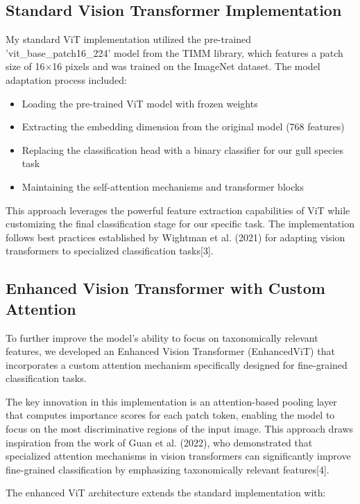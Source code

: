 \subsection{Standard Vision Transformer Implementation}

My standard ViT implementation utilized the pre-trained 'vit\_base\_patch16\_224' model from the TIMM library, which features a patch size of 16$\times$16 pixels and was trained on the ImageNet dataset. The model adaptation process included:

\begin{itemize}
    \item Loading the pre-trained ViT model with frozen weights
    \item Extracting the embedding dimension from the original model (768 features)
    \item Replacing the classification head with a binary classifier for our gull species task
    \item Maintaining the self-attention mechanisms and transformer blocks
\end{itemize}

This approach leverages the powerful feature extraction capabilities of ViT while customizing the final classification stage for our specific task. The implementation follows best practices established by Wightman et al. (2021) for adapting vision transformers to specialized classification tasks[3].

\subsection{Enhanced Vision Transformer with Custom Attention}

To further improve the model's ability to focus on taxonomically relevant features, we developed an Enhanced Vision Transformer (EnhancedViT) that incorporates a custom attention mechanism specifically designed for fine-grained classification tasks.

The key innovation in this implementation is an attention-based pooling layer that computes importance scores for each patch token, enabling the model to focus on the most discriminative regions of the input image. This approach draws inspiration from the work of Guan et al. (2022), who demonstrated that specialized attention mechanisms in vision transformers can significantly improve fine-grained classification by emphasizing taxonomically relevant features[4].

The enhanced ViT architecture extends the standard implementation with:

